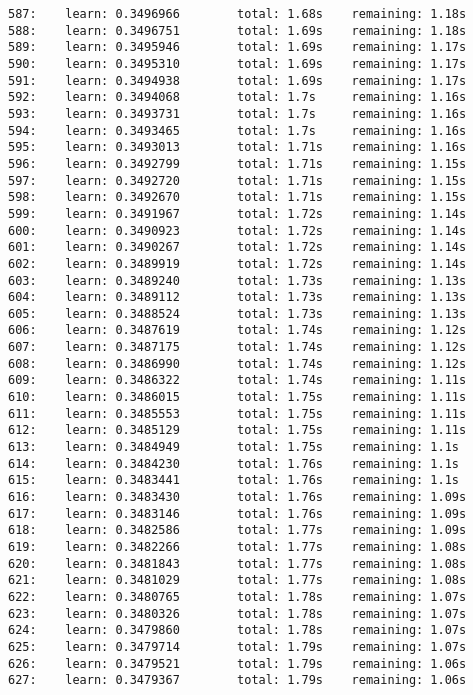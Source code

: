 \documentclass[11pt]{article}
\begin{document}
\begin{Verbatim}[commandchars=\\\{\}]
587:    learn: 0.3496966        total: 1.68s    remaining: 1.18s
588:    learn: 0.3496751        total: 1.69s    remaining: 1.18s
589:    learn: 0.3495946        total: 1.69s    remaining: 1.17s
590:    learn: 0.3495310        total: 1.69s    remaining: 1.17s
591:    learn: 0.3494938        total: 1.69s    remaining: 1.17s
592:    learn: 0.3494068        total: 1.7s     remaining: 1.16s
593:    learn: 0.3493731        total: 1.7s     remaining: 1.16s
594:    learn: 0.3493465        total: 1.7s     remaining: 1.16s
595:    learn: 0.3493013        total: 1.71s    remaining: 1.16s
596:    learn: 0.3492799        total: 1.71s    remaining: 1.15s
597:    learn: 0.3492720        total: 1.71s    remaining: 1.15s
598:    learn: 0.3492670        total: 1.71s    remaining: 1.15s
599:    learn: 0.3491967        total: 1.72s    remaining: 1.14s
600:    learn: 0.3490923        total: 1.72s    remaining: 1.14s
601:    learn: 0.3490267        total: 1.72s    remaining: 1.14s
602:    learn: 0.3489919        total: 1.72s    remaining: 1.14s
603:    learn: 0.3489240        total: 1.73s    remaining: 1.13s
604:    learn: 0.3489112        total: 1.73s    remaining: 1.13s
605:    learn: 0.3488524        total: 1.73s    remaining: 1.13s
606:    learn: 0.3487619        total: 1.74s    remaining: 1.12s
607:    learn: 0.3487175        total: 1.74s    remaining: 1.12s
608:    learn: 0.3486990        total: 1.74s    remaining: 1.12s
609:    learn: 0.3486322        total: 1.74s    remaining: 1.11s
610:    learn: 0.3486015        total: 1.75s    remaining: 1.11s
611:    learn: 0.3485553        total: 1.75s    remaining: 1.11s
612:    learn: 0.3485129        total: 1.75s    remaining: 1.11s
613:    learn: 0.3484949        total: 1.75s    remaining: 1.1s
614:    learn: 0.3484230        total: 1.76s    remaining: 1.1s
615:    learn: 0.3483441        total: 1.76s    remaining: 1.1s
616:    learn: 0.3483430        total: 1.76s    remaining: 1.09s
617:    learn: 0.3483146        total: 1.76s    remaining: 1.09s
618:    learn: 0.3482586        total: 1.77s    remaining: 1.09s
619:    learn: 0.3482266        total: 1.77s    remaining: 1.08s
620:    learn: 0.3481843        total: 1.77s    remaining: 1.08s
621:    learn: 0.3481029        total: 1.77s    remaining: 1.08s
622:    learn: 0.3480765        total: 1.78s    remaining: 1.07s
623:    learn: 0.3480326        total: 1.78s    remaining: 1.07s
624:    learn: 0.3479860        total: 1.78s    remaining: 1.07s
625:    learn: 0.3479714        total: 1.79s    remaining: 1.07s
626:    learn: 0.3479521        total: 1.79s    remaining: 1.06s
627:    learn: 0.3479367        total: 1.79s    remaining: 1.06s

\end{Verbatim}
\end{document}
